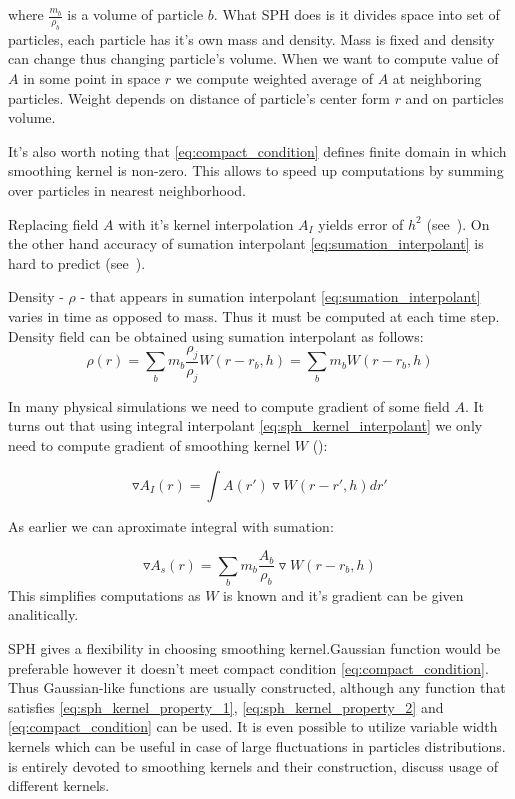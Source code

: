 where $\frac{m_b}{\rho_b}$ is a volume of particle $b$. What SPH does is it divides space into set of particles, each particle has it's own mass and density. Mass is fixed and density can change thus changing particle's volume. When we want to compute value of $A$ in some point in space $r$ we compute weighted average of $A$ at neighboring particles. Weight depends on distance of particle's center form $r$ and on particles volume. 

It's also worth noting that \ref{eq:compact_condition} defines finite domain in which smoothing kernel is non-zero. This allows to speed up computations by summing over particles in nearest neighborhood.

Replacing field $A$ with it's kernel interpolation $A_I$ yields error of $h^2$ (see~\cite[section 2.2.1]{Liu}). On the other hand accuracy of sumation interpolant \ref{eq:sumation_interpolant} is hard to predict (see~\cite[section 12.1]{Monaghan1992}).

Density - $\rho$ - that appears in sumation interpolant \ref{eq:sumation_interpolant} varies in time as opposed to mass. Thus it must be computed at each time step. Density field can be obtained using sumation interpolant as follows:
\begin{equation}
\label{eq:sph_density}
\rho(r) = \sum_{b}m_b\frac{\rho_j}{\rho_j}W(r-r_b, h) = \sum_{b}m_b W(r-r_b, h)
\end{equation}

In many physical simulations we need to compute gradient of some field $A$. It turns out that using integral interpolant \ref{eq:sph_kernel_interpolant} we only need to compute gradient of smoothing kernel $W$ (\cite[section 2.2.2]{Liu}):

\begin{equation}
\label{eq:integral_interpolant_gradient}
\triangledown A_I(r) = \int A(r') \triangledown W(r - r', h)dr'
\end{equation}

As earlier we can aproximate integral with sumation:

\begin{equation}
\label{eq:sumation_interpolant_gradient}
\triangledown A_s(r) = \sum_{b}m_b\frac{A_b}{\rho_b}\triangledown W(r-r_b,h) 
\end{equation}
This simplifies computations as $W$ is known and it's gradient can be given analitically. 

SPH gives a flexibility in choosing smoothing kernel.Gaussian function would be preferable however it doesn't meet compact condition \ref{eq:compact_condition}. Thus Gaussian-like functions are usually constructed, although any function that satisfies \ref{eq:sph_kernel_property_1}, \ref{eq:sph_kernel_property_2} and \ref{eq:compact_condition} can be used. It is even possible to utilize variable width kernels \cite[section 6]{Monaghan1992} which can be useful in case of large fluctuations in particles distributions. \cite[chapter 3]{Liu} is entirely devoted to smoothing kernels and their construction, \cite[section 3.5]{Muller2003} discuss usage of different kernels. 


